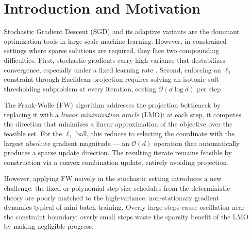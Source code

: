 \documentclass[10pt,twocolumn]{article}
\begin{document}

\section{Introduction and Motivation}
\label{sec:intro}

Stochastic Gradient Descent (SGD) and its adaptive variants are the
dominant optimization tools in large-scale machine learning. However, in
constrained settings where sparse solutions are required, they face two
compounding difficulties. First, stochastic gradients carry high variance
that destabilizes convergence, especially under a fixed learning rate
\cite{robbins1951}. Second, enforcing an $\ell_1$ constraint through
Euclidean projection requires solving an isotonic soft-thresholding
subproblem at every iteration, costing $\mathcal{O}(d \log d)$ per step
\cite{duchi2008}.

The Frank-Wolfe (FW) algorithm \cite{frank1956,jaggi2013} addresses the
projection bottleneck by replacing it with a \emph{linear minimization
oracle} (LMO): at each step, it computes the direction that minimizes a
linear approximation of the objective over the feasible set. For the
$\ell_1$ ball, this reduces to selecting the coordinate with the largest
absolute gradient magnitude — an $\mathcal{O}(d)$ operation that
automatically produces a sparse update direction. The resulting iterate
remains feasible by construction via a convex combination update, entirely
avoiding projection.

However, applying FW naively in the stochastic setting introduces a new
challenge: the fixed or polynomial step size schedules from the deterministic
theory are poorly matched to the high-variance, non-stationary gradient
dynamics typical of mini-batch training. Overly large steps cause oscillation
near the constraint boundary; overly small steps waste the sparsity benefit
of the LMO by making negligible progress.
\end{document}

